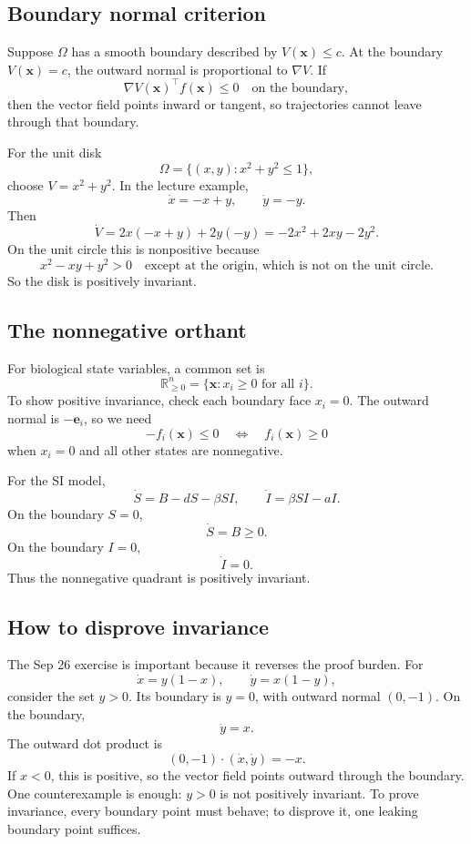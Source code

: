 \documentclass[a4paper]{article}
\newcommand{\R}{\mathbb{R}}
\newcommand{\vect}[1]{\boldsymbol{#1}}
\newcommand{\Rpos}{\R_{\ge 0}}
\begin{document}
\subsection{Boundary normal criterion}

Suppose \(\Omega\) has a smooth boundary described by \(V(\vect x)\le c\). At the boundary \(V(\vect x)=c\), the outward normal is proportional to \(\nabla V\). If
\[
  \nabla V(\vect x)^\top f(\vect x)\le 0
  \quad\text{on the boundary},
\]
then the vector field points inward or tangent, so trajectories cannot leave through that boundary.

For the unit disk
\[
  \Omega=\{(x,y):x^2+y^2\le 1\},
\]
choose \(V=x^2+y^2\). In the lecture example,
\[
  \dot x=-x+y,\qquad \dot y=-y.
\]
Then
\[
  \dot V=2x(-x+y)+2y(-y)
  =-2x^2+2xy-2y^2.
\]
On the unit circle this is nonpositive because
\[
  x^2-xy+y^2>0
  \quad \text{except at the origin, which is not on the unit circle.}
\]
So the disk is positively invariant.

\subsection{The nonnegative orthant}

For biological state variables, a common set is
\[
  \Rpos^n=\{\vect x:x_i\ge 0\text{ for all }i\}.
\]
To show positive invariance, check each boundary face \(x_i=0\). The outward normal is \(-\vect e_i\), so we need
\[
  -f_i(\vect x)\le 0
  \quad\Longleftrightarrow\quad
  f_i(\vect x)\ge 0
\]
when \(x_i=0\) and all other states are nonnegative.

For the SI model,
\[
  \dot S=B-dS-\beta SI,\qquad
  \dot I=\beta SI-aI.
\]
On the boundary \(S=0\),
\[
  \dot S=B\ge 0.
\]
On the boundary \(I=0\),
\[
  \dot I=0.
\]
Thus the nonnegative quadrant is positively invariant.

\subsection{How to disprove invariance}

The Sep 26 exercise is important because it reverses the proof burden. For
\[
  \dot x=y(1-x),\qquad \dot y=x(1-y),
\]
consider the set \(y>0\). Its boundary is \(y=0\), with outward normal \((0,-1)\). On the boundary,
\[
  \dot y=x.
\]
The outward dot product is
\[
  (0,-1)\cdot(\dot x,\dot y)=-x.
\]
If \(x<0\), this is positive, so the vector field points outward through the boundary. One counterexample is enough: \(y>0\) is not positively invariant. To prove invariance, every boundary point must behave; to disprove it, one leaking boundary point suffices.
\end{document}
